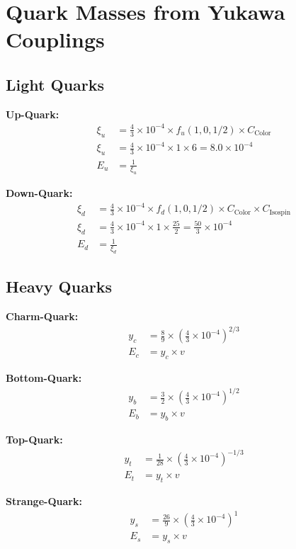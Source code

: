 \documentclass[12pt,a4paper]{article}
\begin{document}
	\section{Quark Masses from Yukawa Couplings}
	
	\subsection{Light Quarks}
	
	\textbf{Up-Quark:}
	\begin{align}
		\xi_u &= \frac{4}{3} \times 10^{-4} \times f_u(1,0,1/2) \times C_{\text{Color}} \\
		\xi_u &= \frac{4}{3} \times 10^{-4} \times 1 \times 6 = 8.0 \times 10^{-4} \\
		E_u &= \frac{1}{\xi_u}
	\end{align}
	
	\textbf{Down-Quark:}
	\begin{align}
		\xi_d &= \frac{4}{3} \times 10^{-4} \times f_d(1,0,1/2) \times C_{\text{Color}} \times C_{\text{Isospin}} \\
		\xi_d &= \frac{4}{3} \times 10^{-4} \times 1 \times \frac{25}{2} = \frac{50}{3} \times 10^{-4} \\
		E_d &= \frac{1}{\xi_d}
	\end{align}
	
	\subsection{Heavy Quarks}
	
	\textbf{Charm-Quark:}
	\begin{align}
		y_c &= \frac{8}{9} \times \left(\frac{4}{3} \times 10^{-4}\right)^{2/3} \\
		E_c &= y_c \times v
	\end{align}
	
	\textbf{Bottom-Quark:}
	\begin{align}
		y_b &= \frac{3}{2} \times \left(\frac{4}{3} \times 10^{-4}\right)^{1/2} \\
		E_b &= y_b \times v
	\end{align}
	
	\textbf{Top-Quark:}
	\begin{align}
		y_t &= \frac{1}{28} \times \left(\frac{4}{3} \times 10^{-4}\right)^{-1/3} \\
		E_t &= y_t \times v
	\end{align}
	
	\textbf{Strange-Quark:}
	\begin{align}
		y_s &= \frac{26}{9} \times \left(\frac{4}{3} \times 10^{-4}\right)^{1} \\
		E_s &= y_s \times v
	\end{align}
	
\end{document}
